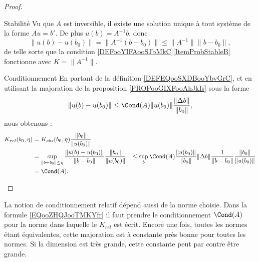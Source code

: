 \begin{proof}
    \begin{subproof}
    \item[Stabilité]
        Vu que \( A\) est inversible, il existe une solution unique à tout système de la forme \( Au=b'\). De plus \( u(b)=A^{-1} b\), donc
        \begin{equation}
            \| u(b)-u(b_0) \|= \| A^{-1}(b-b_0) \|\leq \| A^{-1} \|\| b-b_0 \|,
        \end{equation}
        de telle sorte que la condition \ref{DEFooYIFAooSJbMkC}\ref{ItemProbStableB} fonctionne avec \( K=\| A^{-1} \|\).
    \item[Conditionnement]
        En partant de la définition \ref{DEFEQooSXDBooYbvGrC}, et en utilisant la majoration de la proposition \ref{PROPooGIXFooAhJkIs} sous la forme
        \begin{equation}
            \| u(b)-u(b_0) \|\leq \Cond(A)\| u(b_0) \|\frac{ \| \Delta b \| }{ \| b_0 \| },
        \end{equation}
        nous obtenons :
        \begin{subequations}
            \begin{align}
                K_{rel}(b_0,\eta)&=K_{abs}(b_0,\eta)\frac{ \| b_0 \| }{ \| u(b_0) \| }\\
                &=\sup_{\| b-b_0 \|\leq \eta}\frac{ \| u(b)-u(b_0) \| }{ \| b-b_0 \| }\frac{ \| b_0 \| }{ \| u(b_0) \| }
                &\leq \sup_b\Cond(A)\frac{ \| u(b_0) \| }{ \| b_0 \| }\| \Delta b \|\frac{1}{ \| b-b_0 \| }\frac{ \| b_0 \| }{ \| u(b_0) \| }\\
                &=\Cond(A).
            \end{align}
        \end{subequations}
    \end{subproof}
\end{proof}


\begin{remark}      \label{REMooAIKIooJEBEqi}
    La notion de conditionnement relatif dépend aussi de la norme choisie. Dans la formule \eqref{EQooZHQJooTMKYfr} il faut prendre le conditionnement \( \Cond(A)\) pour la norme dans laquelle le \( K_{rel}\) est écrit. Encore une fois, toutes les normes étant équivalentes,  cette majoration est à constante près bonne pour toutes les normes. Si la dimension est très grande, cette constante peut par contre être grande.
\end{remark}

